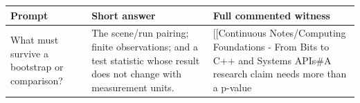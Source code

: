{\def\LTcaptype{none} %
\begin{longtable}[]{@{}
  >{\raggedright\arraybackslash}p{}
  >{\raggedright\arraybackslash}p{}
  >{\raggedright\arraybackslash}p{}@{}}
\toprule\noalign{}
\begin{minipage}[b]{\linewidth}\raggedright
Prompt
\end{minipage} & \begin{minipage}[b]{\linewidth}\raggedright
Short answer
\end{minipage} & \begin{minipage}[b]{\linewidth}\raggedright
Full commented witness
\end{minipage} \\
\midrule\noalign{}
\endhead
\bottomrule\noalign{}
\endlastfoot
What must survive a bootstrap or comparison? & The scene/run pairing; finite observations; and a test statistic whose result does not change with measurement units. & {[}{[}Continuous Notes/Computing Foundations - From Bits to C++ and Systems APIs\#A research claim needs more than a p-value \\
\end{longtable}
}
